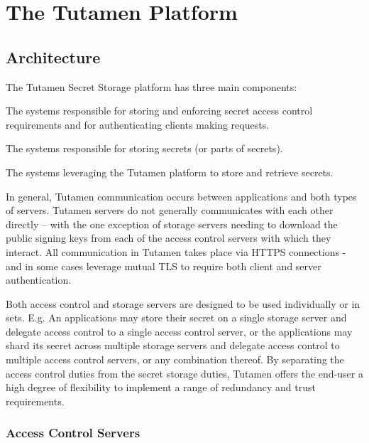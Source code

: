 \section{The Tutamen Platform}
\label{sec:tutamen}

\subsection{Architecture}

The Tutamen Secret Storage platform has three main components:

\begin{packed_desc}
\item[Access Control Servers (ACS):] The systems responsible for
  storing and enforcing secret access control requirements and for
  authenticating clients making requests.
\item[Storage Servers (SS):] The systems responsible for storing
  secrets (or parts of secrets).
\item[Tutamen Applications (TA):] The systems leveraging the Tutamen
  platform to store and retrieve secrets.
\end{packed_desc}

In general, Tutamen communication occurs between applications and both
types of servers. Tutamen servers do not generally communicates with
each other directly -- with the one exception of storage servers
needing to download the public signing keys from each of the access
control servers with which they interact. All communication in Tutamen
takes place via HTTPS connections - and in some cases leverage mutual
TLS to require both client and server authentication.

Both access control and storage servers are designed to be used
individually or in sets. E.g. An applications may store their secret
on a single storage server and delegate access control to a single
access control server, or the applications may shard its secret across
multiple storage servers and delegate access control to multiple
access control servers, or any combination thereof. By separating the
access control duties from the secret storage duties, Tutamen offers
the end-user a high degree of flexibility to implement a range of
redundancy and trust requirements.

\subsubsection{Access Control Servers}

